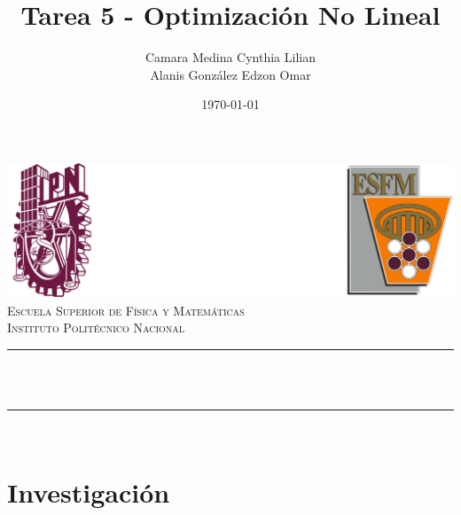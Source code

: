 \documentclass[12pt]{article}
\title{Tarea 5 - Optimización No Lineal}
\author{Camara Medina Cynthia Lilian \\[0.5cm]
Alanis González Edzon Omar}
\date{\today}
\makeatletter
\let\thetitle\@title
\let\theauthor\@author
\let\thedate\@date
\makeatother
\begin{document}
\begin{titlepage}
\centering
\includegraphics[width=0.9\linewidth]{../logo.png}\\[2.0 cm]
\textsc{\LARGE Escuela Superior de Física y Matemáticas}\\[1.2 cm]
\textsc{\Large Instituto Politécnico Nacional}\\[2.5 cm]
\rule{\linewidth}{0.2 mm} \\[0.4 cm]
{\huge \bfseries \thetitle}\\
\rule{\linewidth}{0.2 mm} \\[2.5 cm]
\textsc{\large \theauthor}
\vfill
{\large \thedate}
\end{titlepage}

\section*{Investigación}
\end{document}
